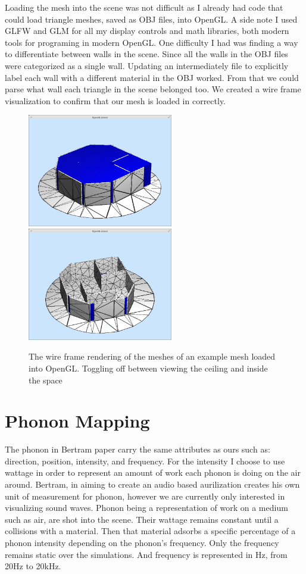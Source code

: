 \documentclass{thesis}
\begin{document}
Loading the mesh into the scene was not difficult as I already had code that could load triangle meshes, saved as OBJ files, into OpenGL. A side note I used GLFW and GLM for all my display controls and math libraries, both modern tools for programing in modern OpenGL. One difficulty I had was finding a way to differentiate between walls in the scene. Since all the walls in the OBJ files were categorized as a single wall. Updating an intermediately file to explicitly label each wall with a different material in the OBJ worked. From that we could parse what wall each triangle in the scene belonged too. We created a wire frame visualization to confirm that our mesh is loaded in correctly.
 \begin{figure}
        \centering
        \includegraphics[width=2.5in]{images/wireframe}
        \includegraphics[width=2.5in]{images/wireframe_open}
        \caption{The wire frame rendering of the meshes of an example mesh loaded into OpenGL. Toggling off between viewing the ceiling and inside the space}
    \end{figure}

\section{Phonon Mapping}
The phonon in Bertram paper carry the same attributes as ours such as: direction, position, intensity, and frequency. For the intensity I choose to use wattage in order to represent an amount of work each phonon is doing on the air around. Bertram, in aiming to create an audio  based aurilization creates his own unit of measurement for phonon, however we are currently only interested in visualizing sound waves. Phonon being a representation of work on a medium such as air, are shot into the scene.  Their wattage remains constant until a collisions with a material. Then that material  adsorbs a specific percentage of a phonon intensity depending on the phonon's frequency. Only the frequency remains static over the simulations. And frequency is represented in Hz, from 20Hz to 20kHz.
\end{document}

